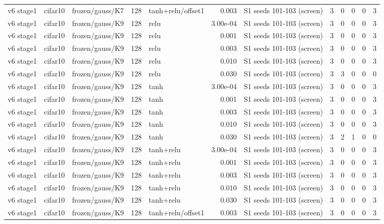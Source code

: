 \begin{table}[htbp]
{\begin{tabular}{@{}lllrlrlrrrrr@{}}
v6 stage1 & cifar10 & frozen/gauss/K7 & 128 & tanh+relu/offset1 & 0.003 & S1 seeds 101-103 (screen) & 3 & 0 & 0 & 0 & 3 \\
v6 stage1 & cifar10 & frozen/gauss/K9 & 128 & relu & 3.00e-04 & S1 seeds 101-103 (screen) & 3 & 0 & 0 & 0 & 3 \\
v6 stage1 & cifar10 & frozen/gauss/K9 & 128 & relu & 0.001 & S1 seeds 101-103 (screen) & 3 & 0 & 0 & 0 & 3 \\
v6 stage1 & cifar10 & frozen/gauss/K9 & 128 & relu & 0.003 & S1 seeds 101-103 (screen) & 3 & 0 & 0 & 0 & 3 \\
v6 stage1 & cifar10 & frozen/gauss/K9 & 128 & relu & 0.010 & S1 seeds 101-103 (screen) & 3 & 0 & 0 & 0 & 3 \\
v6 stage1 & cifar10 & frozen/gauss/K9 & 128 & relu & 0.030 & S1 seeds 101-103 (screen) & 3 & 3 & 0 & 0 & 0 \\
v6 stage1 & cifar10 & frozen/gauss/K9 & 128 & tanh & 3.00e-04 & S1 seeds 101-103 (screen) & 3 & 0 & 0 & 0 & 3 \\
v6 stage1 & cifar10 & frozen/gauss/K9 & 128 & tanh & 0.001 & S1 seeds 101-103 (screen) & 3 & 0 & 0 & 0 & 3 \\
v6 stage1 & cifar10 & frozen/gauss/K9 & 128 & tanh & 0.003 & S1 seeds 101-103 (screen) & 3 & 0 & 0 & 0 & 3 \\
v6 stage1 & cifar10 & frozen/gauss/K9 & 128 & tanh & 0.010 & S1 seeds 101-103 (screen) & 3 & 0 & 0 & 0 & 3 \\
v6 stage1 & cifar10 & frozen/gauss/K9 & 128 & tanh & 0.030 & S1 seeds 101-103 (screen) & 3 & 2 & 1 & 0 & 0 \\
v6 stage1 & cifar10 & frozen/gauss/K9 & 128 & tanh+relu & 3.00e-04 & S1 seeds 101-103 (screen) & 3 & 0 & 0 & 0 & 3 \\
v6 stage1 & cifar10 & frozen/gauss/K9 & 128 & tanh+relu & 0.001 & S1 seeds 101-103 (screen) & 3 & 0 & 0 & 0 & 3 \\
v6 stage1 & cifar10 & frozen/gauss/K9 & 128 & tanh+relu & 0.003 & S1 seeds 101-103 (screen) & 3 & 0 & 0 & 0 & 3 \\
v6 stage1 & cifar10 & frozen/gauss/K9 & 128 & tanh+relu & 0.010 & S1 seeds 101-103 (screen) & 3 & 0 & 0 & 0 & 3 \\
v6 stage1 & cifar10 & frozen/gauss/K9 & 128 & tanh+relu & 0.030 & S1 seeds 101-103 (screen) & 3 & 0 & 0 & 0 & 3 \\
v6 stage1 & cifar10 & frozen/gauss/K9 & 128 & tanh+relu/offset1 & 0.003 & S1 seeds 101-103 (screen) & 3 & 0 & 0 & 0 & 3 \\

\end{tabular}}
\end{table}

